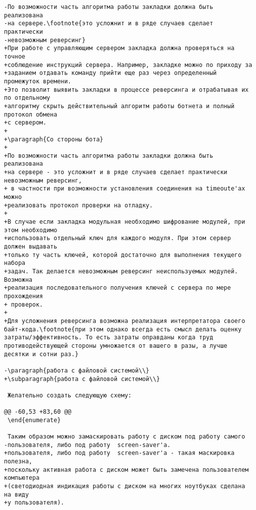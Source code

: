 \begin{verbatim}
-По возможности часть алгоритма работы закладки должна быть реализована
-на сервере.\footnote{это усложнит и в ряде случаев сделает практически
-невозможным реверсинг}
+При работе с управляющим сервером закладка должна проверяться на точное
+соблюдение инструкций сервера. Например, закладке можно по приходу за
+заданием отдавать команду прийти еще раз через определенный промежуток времени.
+Это позволит выявить закладки в процессе реверсинга и отрабатывая их по отдельному
+алгоритму скрыть действительный алгоритм работы ботнета и полный протокол обмена
+с сервером.
+
+\paragraph{Со стороны бота}
+
+По возможности часть алгоритма работы закладки должна быть реализована
+на сервере - это усложнит и в ряде случаев сделает практически невозможным реверсинг,
+ в частности при возможности установления соединения на timeoute'ах можно
+реализовать протокол проверки на отладку.
+
+В случае если закладка модульная необходимо шифрование модулей, при этом необходимо
+использовать отдельный ключ для каждого модуля. При этом сервер должен выдавать
+только ту часть ключей, которой достаточно для выполнения текущего набора
+задач. Так делается невозможным реверсинг неиспользуемых модулей. Возможна
+реализация последовательного получения ключей с сервера по мере прохождения
+ проверок.
+
+Для усложнения реверсинга возможна реализация интерпретатора своего байт-кода.\footnote{при этом однако всегда есть смысл делать оценку затраты/эффективность. То есть затраты оправданы когда труд противодействующей стороны умножается от вашего в разы, а лучше десятки и сотни раз.}

-\paragraph{работа с файловой системой\\}
+\subparagraph{работа с файловой системой\\}

 Желательно создать следующую схему:

@@ -60,53 +83,60 @@
 \end{enumerate}

 Таким образом можно замаскировать работу с диском под работу самого
-пользователя, либо под работу  screen-saver'а.
+пользователя, либо под работу  screen-saver'а - такая маскировка полезна,
+поскольку активная работа с диском может быть замечена пользователем компьютера
+(светодиодная индикация работы с диском на многих ноутбуках сделана на виду
+у пользователя).



\end{verbatim}
